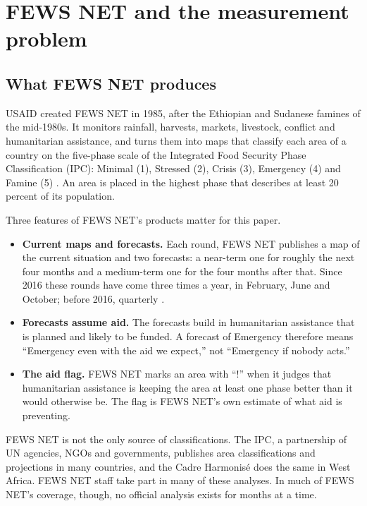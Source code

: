 \documentclass[11pt]{article}
\begin{document}
\section{FEWS NET and the measurement problem}\label{sec:background}

\subsection{What FEWS NET produces}

USAID created FEWS NET in 1985, after the Ethiopian and Sudanese famines of the mid-1980s. It monitors rainfall, harvests, markets, livestock, conflict and humanitarian assistance, and turns them into maps that classify each area of a country on the five-phase scale of the Integrated Food Security Phase Classification (IPC): Minimal (1), Stressed (2), Crisis (3), Emergency (4) and Famine (5) \citep{IPC2021manual}. An area is placed in the highest phase that describes at least 20 percent of its population.

Three features of FEWS NET's products matter for this paper.
\begin{itemize}
  \item \textbf{Current maps and forecasts.} Each round, FEWS NET publishes a map of the current situation and two forecasts: a near-term one for roughly the next four months and a medium-term one for the four months after that. Since 2016 these rounds have come three times a year, in February, June and October; before 2016, quarterly \citep{FEWSNET2018scenario}.
  \item \textbf{Forecasts assume aid.} The forecasts build in humanitarian assistance that is planned and likely to be funded. A forecast of Emergency therefore means ``Emergency even with the aid we expect,'' not ``Emergency if nobody acts.''
  \item \textbf{The aid flag.} FEWS NET marks an area with ``!'' when it judges that humanitarian assistance is keeping the area at least one phase better than it would otherwise be. The flag is FEWS NET's own estimate of what aid is preventing.
\end{itemize}

FEWS NET is not the only source of classifications. The IPC, a partnership of UN agencies, NGOs and governments, publishes area classifications and projections in many countries, and the Cadre Harmonis\'e does the same in West Africa. FEWS NET staff take part in many of these analyses. In much of FEWS NET's coverage, though, no official analysis exists for months at a time.
\end{document}
